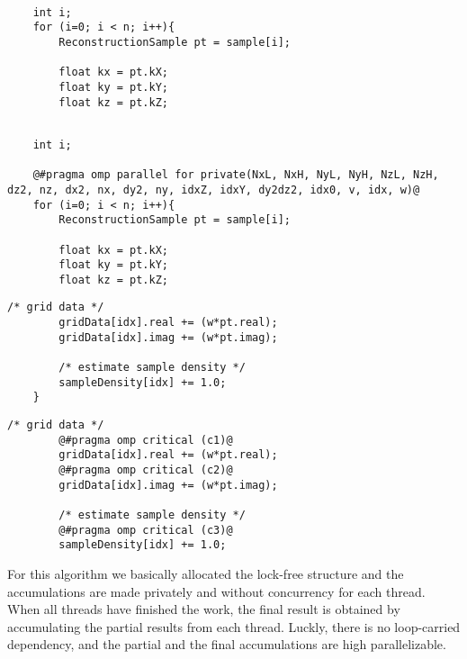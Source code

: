 \documentclass[10pt,a4paper]{report}
\begin{document}
\begin{center}
\begin{minipage}{.48\textwidth}
\begin{lstlisting}[caption=Parboil sequential main loop for mri-gridding,style=base]

	int i;
	for (i=0; i < n; i++){
		ReconstructionSample pt = sample[i];

		float kx = pt.kX;
		float ky = pt.kY;
		float kz = pt.kZ;
\end{lstlisting}
\end{minipage}
\hfill
\begin{minipage}{.48\textwidth}
\begin{lstlisting}[caption=Parboil parallel main loop for mri-gridding,style=base]

	int i;

	@#pragma omp parallel for private(NxL, NxH, NyL, NyH, NzL, NzH, dz2, nz, dx2, nx, dy2, ny, idxZ, idxY, dy2dz2, idx0, v, idx, w)@
	for (i=0; i < n; i++){
		ReconstructionSample pt = sample[i];

		float kx = pt.kX;
		float ky = pt.kY;
		float kz = pt.kZ;
\end{lstlisting}

\end{minipage}
\hfill
\begin{minipage}{.48\textwidth}
\begin{lstlisting}[caption=Parboil sequential data processing code for mri-gridding,style=base]
		/* grid data */
		gridData[idx].real += (w*pt.real);
		gridData[idx].imag += (w*pt.imag);

		/* estimate sample density */
		sampleDensity[idx] += 1.0;
	}
\end{lstlisting}
\end{minipage}
\hfill
\begin{minipage}{.48\textwidth}
\begin{lstlisting}[caption=Parboil parallel data processing code for mri-gridding,style=base]
		/* grid data */
		@#pragma omp critical (c1)@
		gridData[idx].real += (w*pt.real);
		@#pragma omp critical (c2)@
		gridData[idx].imag += (w*pt.imag);

		/* estimate sample density */
		@#pragma omp critical (c3)@
		sampleDensity[idx] += 1.0;
\end{lstlisting}
\end{minipage}
\end{center}

For this algorithm we basically allocated the lock-free structure and the accumulations are made privately and without concurrency for each thread. When all threads have finished the work, the final result is obtained by accumulating the partial results from each thread. Luckly, there is no loop-carried dependency, and the partial and the final accumulations are high parallelizable.\\
\end{document}
